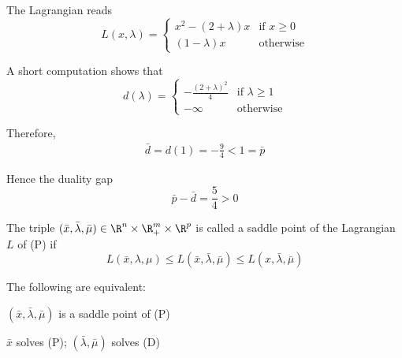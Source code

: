 
The Lagrangian reads
$$
  L(x,\lambda)=\begin{cases}
    x^2-(2+\lambda)x & \text{if } x\geq0 \\
    (1-\lambda)x     & \text{otherwise}
  \end{cases}
$$

A short computation shows that
$$
  d(\lambda)=\begin{cases}
    -\frac{(2+\lambda)^2}{4} & \text{if }\lambda\geq1 \\
    -\infty                  & \text{otherwise}
  \end{cases}
$$

Therefore,
\begin{align*}
  \bar d=d(1)=-\frac94<1=\bar p
\end{align*}

Hence the duality gap
$$
  \bar p-\bar d=\frac54>0
$$

\label{e1525d8}

The triple $(\bar x,\bar\lambda,\bar\mu)\in\R^n\times\R^m_+\times\R^p$ is
called a saddle point of the Lagrangian $L$ of (P) if
$$
  L(\bar x,\lambda,\mu)\leq
  L(\bar x,\bar\lambda,\bar\mu)\leq
  L(x,\bar\lambda,\bar\mu)
$$

\label{dc4af95}

The following are equivalent:
\begin{enumerati}
  \item $(\bar x,\bar\lambda,\bar\mu)$ is a saddle point of (P)
  \item $\bar x$ solves (P); $(\bar\lambda,\bar\mu)$ solves (D)
\end{enumerati}

